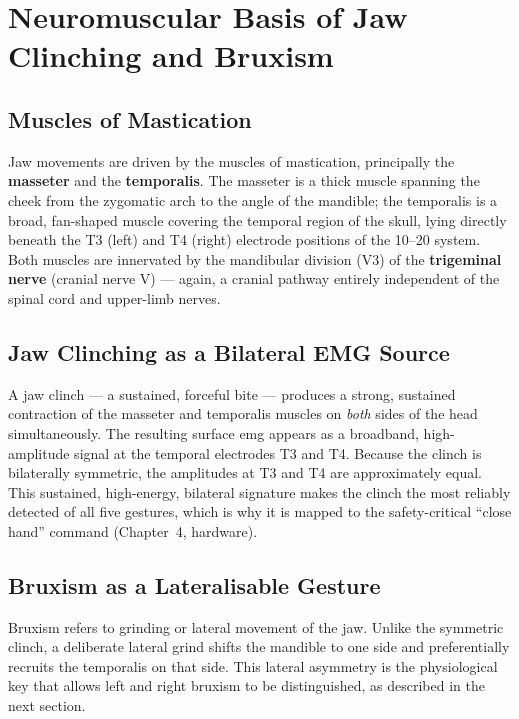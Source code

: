 \section{Neuromuscular Basis of Jaw Clinching and Bruxism}
\label{sec:med_jaw}

\subsection{Muscles of Mastication}

Jaw movements are driven by the muscles of mastication, principally
the \textbf{masseter} and the \textbf{temporalis}. The masseter is a
thick muscle spanning the cheek from the zygomatic arch to the angle
of the mandible; the temporalis is a broad, fan-shaped muscle covering
the temporal region of the skull, lying directly beneath the T3 (left)
and T4 (right) electrode positions of the 10--20 system. Both muscles
are innervated by the mandibular division (V3) of the \textbf{trigeminal
nerve} (cranial nerve V) --- again, a cranial pathway entirely
independent of the spinal cord and upper-limb nerves.

\subsection{Jaw Clinching as a Bilateral EMG Source}

A jaw clinch --- a sustained, forceful bite --- produces a strong,
sustained contraction of the masseter and temporalis muscles on
\emph{both} sides of the head simultaneously. The resulting surface
\acrshort{emg} appears as a broadband, high-amplitude signal at the
temporal electrodes T3 and T4. Because the clinch is bilaterally
symmetric, the amplitudes at T3 and T4 are approximately equal. This
sustained, high-energy, bilateral signature makes the clinch the most
reliably detected of all five gestures, which is why it is mapped to
the safety-critical ``close hand'' command (Chapter~4, hardware).

\subsection{Bruxism as a Lateralisable Gesture}

Bruxism refers to grinding or lateral movement of the jaw. Unlike the
symmetric clinch, a deliberate lateral grind shifts the mandible to
one side and preferentially recruits the temporalis on that side. This
lateral asymmetry is the physiological key that allows left and right
bruxism to be distinguished, as described in the next section.

